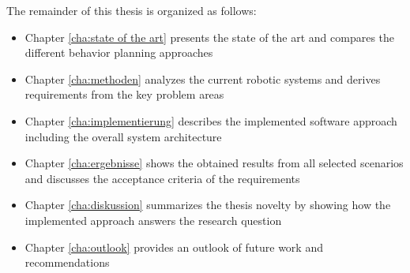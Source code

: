 The remainder of this thesis is organized as follows:

\begin{itemize}
	\item Chapter \ref{cha:state of the art} presents the state of the art and compares the different behavior planning approaches
	
	\item Chapter \ref{cha:methoden} analyzes the current robotic systems and derives requirements from the key problem areas
	
	\item Chapter \ref{cha:implementierung} describes the implemented software approach including the overall system architecture 
	
	\item Chapter \ref{cha:ergebnisse} shows the obtained results from all selected scenarios and discusses the acceptance criteria of the requirements 
	
	\item Chapter \ref{cha:diskussion} summarizes the thesis novelty by showing how the implemented approach answers the research question
	
	\item Chapter \ref{cha:outlook} provides an outlook of future work and recommendations
\end{itemize}


